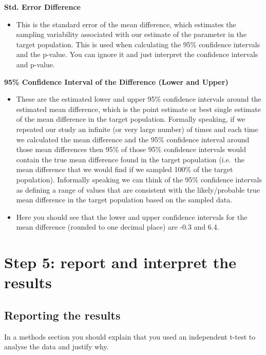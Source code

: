 \documentclass[
]{book}
\providecommand{\tightlist}{%
  \setlength{\itemsep}{0pt}\setlength{\parskip}{0pt}}
\begin{document}
\textbf{Std. Error Difference}

\begin{itemize}
\tightlist
\item
  This is the standard error of the mean difference, which estimates the sampling variability associated with our estimate of the parameter in the target population. This is used when calculating the 95\% confidence intervals and the p-value. You can ignore it and just interpret the confidence intervals and p-value.
\end{itemize}

\textbf{95\% Confidence Interval of the Difference (Lower and Upper)}

\begin{itemize}
\item
  These are the estimated lower and upper 95\% confidence intervals around the estimated mean difference, which is the point estimate or best single estimate of the mean difference in the target population. Formally speaking, if we repeated our study an infinite (or very large number) of times and each time we calculated the mean difference and the 95\% confidence interval around those mean differences then 95\% of those 95\% confidence intervals would contain the true mean difference found in the target population (i.e.~the mean difference that we would find if we sampled 100\% of the target population). Informally speaking we can think of the 95\% confidence intervals as defining a range of values that are consistent with the likely/probable true mean difference in the target population based on the sampled data.
\item
  Here you should see that the lower and upper confidence intervals for the mean difference (rounded to one decimal place) are -0.3 and 6.4.
\end{itemize}

\hypertarget{step-5-report-and-interpret-the-results}{%
\section{Step 5: report and interpret the results}\label{step-5-report-and-interpret-the-results}}

\hypertarget{reporting-the-results}{%
\subsection{Reporting the results}\label{reporting-the-results}}

In a methods section you should explain that you used an independent t-test to analyse the data and justify why.
\end{document}
